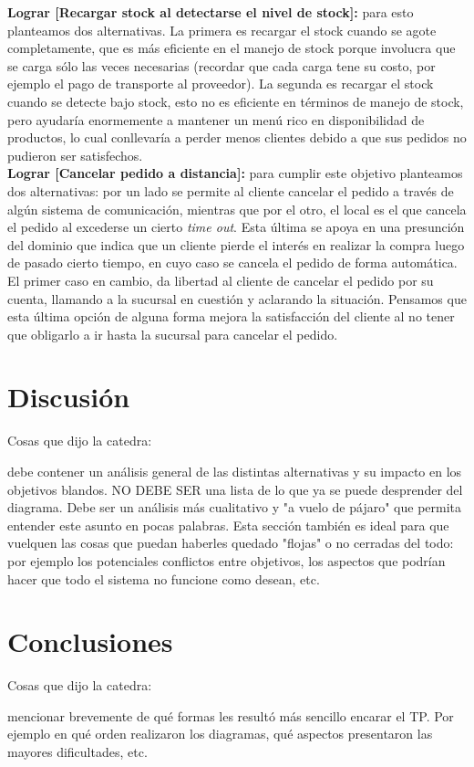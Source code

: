 \documentclass[a4paper,10pt]{article}
\begin{document}
\textbf{Lograr [Recargar stock al detectarse el nivel de stock]:} para esto planteamos dos alternativas. La primera es recargar el stock cuando se agote completamente, que es más eficiente en el manejo de stock porque involucra que se carga sólo las veces necesarias (recordar que cada carga tene su costo, por ejemplo el pago de transporte al proveedor). La segunda es recargar el stock cuando se detecte bajo stock, esto no es eficiente en términos de manejo de stock, pero ayudaría enormemente a mantener un menú rico en disponibilidad de productos, lo cual conllevaría a perder menos clientes debido a que sus pedidos no pudieron ser satisfechos. \\
\textbf{Lograr [Cancelar pedido a distancia]:} para cumplir este objetivo planteamos dos alternativas: por un lado se permite al cliente cancelar el pedido a través de algún sistema de comunicación, mientras que por el otro, el local es el que cancela el pedido al excederse un cierto \textit{time out}. Esta última se apoya en una presunción del dominio que indica que un cliente pierde el interés en realizar la compra luego de pasado cierto tiempo, en cuyo caso se cancela el pedido de forma automática. El primer caso en cambio, da libertad al cliente de cancelar el pedido por su cuenta, llamando a la sucursal en cuestión y aclarando la situación. Pensamos que esta última opción de alguna forma mejora la satisfacción del cliente al no tener que obligarlo a ir hasta la sucursal para cancelar el pedido.


\section*{Discusi\'on}

Cosas que dijo la catedra:

debe contener un análisis general de las distintas
alternativas y su impacto en los objetivos blandos. NO DEBE SER una
lista de lo que ya se puede desprender del diagrama. Debe ser un
análisis más cualitativo y "a vuelo de pájaro" que permita entender
este asunto en pocas palabras. Esta sección también es ideal para que
vuelquen las cosas que puedan haberles quedado "flojas" o no cerradas
del todo: por ejemplo los potenciales conflictos entre objetivos, los
aspectos que podrían hacer que todo el sistema no funcione como
desean, etc.


\section*{Conclusiones}

Cosas que dijo la catedra:

mencionar brevemente de qué formas les resultó más
sencillo encarar el TP. Por ejemplo en qué orden realizaron los
diagramas, qué aspectos presentaron las mayores dificultades, etc.
\end{document}
